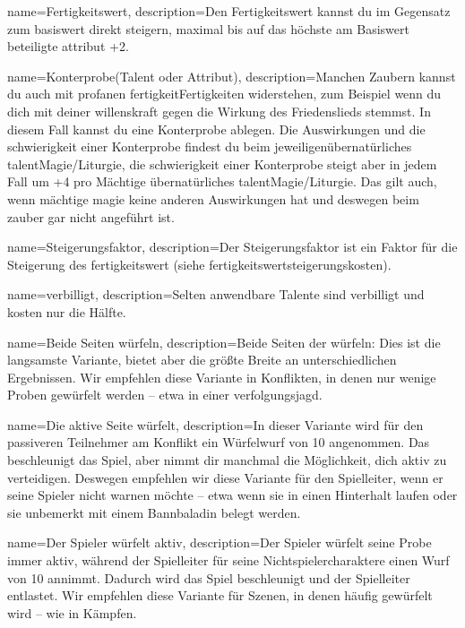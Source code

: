 {
    name={Fertigkeitswert},
    description={Den Fertigkeitswert kannst du im Gegensatz zum \gls{basiswert} direkt steigern, maximal bis auf das höchste am Basiswert beteiligte \gls{attribut} +2.}}

{
    name={Konterprobe(Talent oder Attribut)},
    description={Manchen Zaubern kannst du auch mit profanen \gls{fertigkeit}{Fertigkeiten} widerstehen, zum Beispiel wenn du dich mit deiner \gls{willenskraft} gegen die Wirkung des Friedenslieds stemmst. In diesem Fall kannst du eine Konterprobe ablegen. Die Auswirkungen und die \gls{schwierigkeit} einer Konterprobe findest du beim jeweiligen\gls{übernatürliches talent}{Magie/Liturgie}, die \gls{schwierigkeit} einer Konterprobe steigt aber in jedem Fall um +4 pro Mächtige \gls{übernatürliches talent}{Magie/Liturgie}. Das gilt auch, wenn \gls{mächtige magie} keine anderen Auswirkungen hat und deswegen beim \gls{zauber} gar nicht angeführt ist.}}

{
    name={Steigerungsfaktor},
    description={Der Steigerungsfaktor ist ein Faktor für die Steigerung des \gls{fertigkeitswert} (siehe \gls{fertigkeitswertsteigerungskosten}).}}

{
    name={verbilligt},
    description={Selten anwendbare Talente sind verbilligt und kosten
nur die Hälfte.}}
        

{
    name={Beide Seiten würfeln},
    description={Beide Seiten der  würfeln: Dies ist die langsamste Variante, bietet aber die größte Breite an unterschiedlichen Ergebnissen. Wir empfehlen diese Variante in Konflikten, in denen nur wenige Proben gewürfelt werden – etwa in einer \gls{verfolgungsjagd}.}}

{
    name={Die aktive Seite würfelt},
    description={In dieser Variante wird für den passiveren Teilnehmer am Konflikt ein Würfelwurf von 10 angenommen. Das beschleunigt das Spiel, aber nimmt dir manchmal die Möglichkeit, dich aktiv zu verteidigen. Deswegen empfehlen wir diese Variante für den Spielleiter, wenn er seine Spieler nicht warnen möchte – etwa wenn sie in einen Hinterhalt laufen oder sie unbemerkt mit einem Bannbaladin belegt werden.}}

{
    name={Der Spieler würfelt aktiv},
    description={Der Spieler würfelt seine Probe immer aktiv, während der Spielleiter für seine Nicht­s­­pieler­charaktere einen Wurf von 10 annimmt. Dadurch wird das Spiel beschleunigt und der Spiel­leiter entlastet. Wir empfehlen diese Variante für Szenen, in denen häufig gewürfelt wird – wie in Kämpfen.}}


